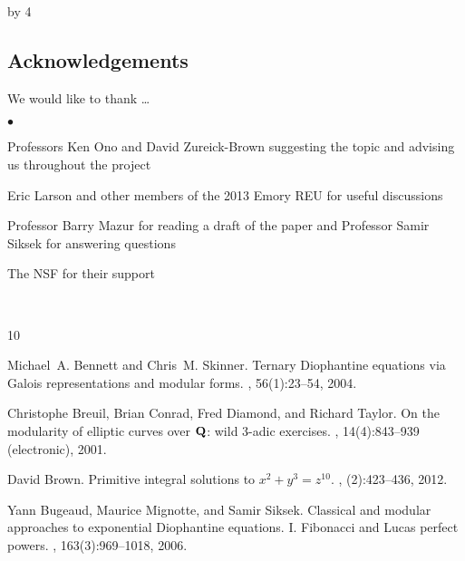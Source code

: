 \documentclass[12pt]{scrartcl}
\newenvironment{citemize}{
\begin{list}{$\bullet$}{\setlength{\itemsep}{0pt} \setlength{\rightmargin}{0pt} \setlength{\leftmargin}{0.5\labelwidth} \setlength{\topsep}{0pt}}
}{\end{list}}
\def\anzspalten{4}
\newlength{\kastenwidth}
\newenvironment{kasten}{%
  \begin{lrbox}{\dummybox}%
    \begin{minipage}{0.96\linewidth}}%
    {\end{minipage}%
  \end{lrbox}%
  \raisebox{-\depth}{\psshadowbox[framesep=1em]{\usebox{\dummybox}}}\\[0.5em]}
\newenvironment{spalte}{%
  \setlength\kastenwidth{1.2\textwidth}
  \divide\kastenwidth by \anzspalten
  \begin{minipage}[t]{\kastenwidth}}{\end{minipage}\hfill}
\begin{document}
\begin{lrbox}{\spalten}
{\begin{spalte}
\begin{kasten}
\subsection*{{\color{blue} Acknowledgements}}
We would like to thank \ldots
\begin{citemize}
\item Professors Ken Ono and David Zureick-Brown suggesting the topic and advising us throughout the project

\item Eric Larson and other members of the 2013 Emory REU for useful discussions

\item Professor Barry Mazur for reading a draft of the paper and Professor Samir Siksek for answering questions

\item The NSF for their support
\end{citemize}
\end{kasten}

\begin{kasten}
         {\small

\begin{thebibliography}{10}


Michael~A. Bennett and Chris~M. Skinner.
\newblock Ternary {D}iophantine equations via {G}alois representations and
  modular forms.
, 56(1):23--54, 2004.

Christophe Breuil, Brian Conrad, Fred Diamond, and Richard Taylor.
\newblock On the modularity of elliptic curves over {$\bold Q$}: wild 3-adic
  exercises.
, 14(4):843--939 (electronic), 2001.

David Brown.
\newblock Primitive integral solutions to {$x^2+y^3=z^{10}$}.
, (2):423--436, 2012.


Yann Bugeaud, Maurice Mignotte, and Samir Siksek.
\newblock Classical and modular approaches to exponential {D}iophantine
  equations. {I}. {F}ibonacci and {L}ucas perfect powers.
, 163(3):969--1018, 2006.


\end{thebibliography}}
\end{kasten}
\end{spalte}}
\end{lrbox}
\end{document}
